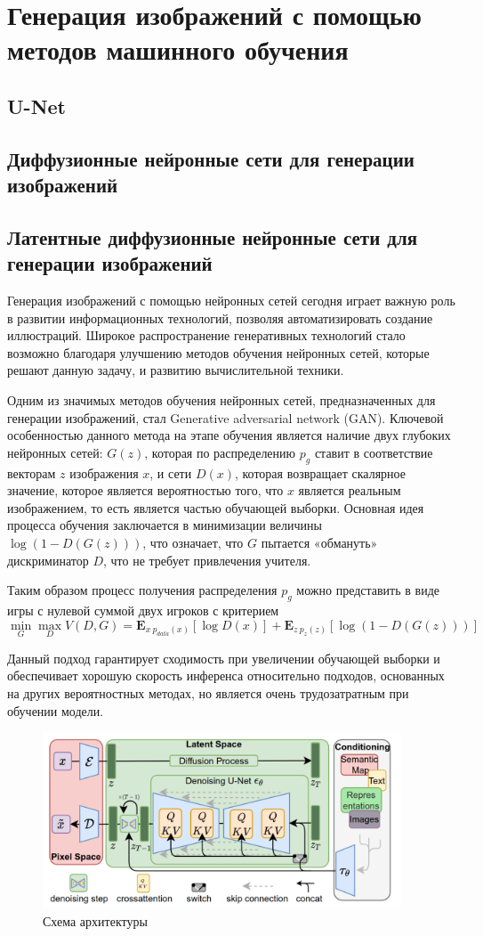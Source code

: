 \chapter{Генерация изображений с помощью методов машинного обучения}
\section{U-Net}
\section{Диффузионные нейронные сети для генерации изображений}
\section{Латентные диффузионные нейронные сети для генерации изображений}

Генерация изображений с помощью нейронных сетей сегодня играет важную роль в развитии
информационных технологий, позволяя автоматизировать создание иллюстраций.
Широкое распространение генеративных технологий стало возможно благодаря улучшению методов обучения нейронных
сетей, которые решают данную задачу, и развитию вычислительной техники.

Одним из значимых методов обучения нейронных сетей, предназначенных для генерации изображений, стал Generative adversarial network (GAN).
Ключевой особенностью данного метода на этапе обучения является наличие двух глубоких нейронных сетей: $G(z)$, которая по распределению $p_g$ ставит
в соответствие векторам $z$ изображения $x$, и сети $D(x)$, которая возвращает скалярное значение,
которое является вероятностью того, что $x$ является реальным изображением, то есть является частью
обучающей выборки. 
Основная идея процесса обучения заключается в минимизации величины $\log (1 - D(G(z)))$, что означает, что $G$ пытается «обмануть» дискриминатор $D$,
что не требует привлечения учителя. 

Таким образом процесс получения распределения $p_g$ можно представить в виде игры с нулевой суммой двух игроков
с критерием 
$$
\min_{G}\max_{D} V(D, G) = \mathbf{E}_{x~p_{data}(x)}[\log D(x)] + \mathbf{E}_{z~p_{z}(z)}[\log (1 - D(G(z)))]
$$ 

Данный подход гарантирует сходимость при увеличении обучающей выборки и обеспечивает хорошую скорость инференса относительно подходов,
основанных на других вероятностных методах, но является очень трудозатратным при обучении модели.


\begin{figure}[H]
  \centering
  \includegraphics[width=0.95\textwidth]{img/latent.png}
  \caption{Схема архитектуры \cite{rombach2022high}}
    \label{fig:latent}
\end{figure}